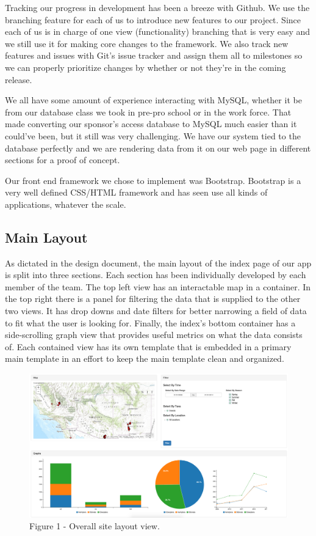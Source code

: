 \documentclass[journal]{IEEEtran}
\begin{document}
Tracking our progress in development has been a breeze with Github. We use the
branching feature for each of us to introduce new features to our project.
Since each of us is in charge of one view (functionality) branching that is
very easy and we still use it for making core changes to the framework. We also
track new features and issues with Git’s issue tracker and assign them all to
milestones so we can properly prioritize changes by whether or not they’re in
the coming release.


We all have some amount of experience interacting with MySQL, whether it be
from our database class we took in pre-pro school or in the work force. That
made converting our sponsor’s access database to MySQL much easier than it
could’ve been, but it still was very challenging. We have our system tied to
the database perfectly and we are rendering data from it on our web page in
different sections for a proof of concept.


Our front end framework we chose to implement was Bootstrap. Bootstrap is a
very well defined CSS/HTML framework and has seen use all kinds of
applications, whatever the scale.

\subsection{Main Layout}
As dictated in the design document, the main layout of the index page of our
app is split into three sections. Each section has been individually developed
by each member of the team. The top left view has an interactable map in a
container. In the top right there is a panel for filtering the data that is
supplied to the other two views. It has drop downs and date filters for better
narrowing a field of data to fit what the user is looking for. Finally, the
index’s bottom container has a side-scrolling graph view that provides useful
metrics on what the data consists of. Each contained view has its own template
that is embedded in a primary main template in an effort to keep the main
template clean and organized.

\begin{figure}[h]
\caption{Figure 1 - Overall site layout view.}
\centering
\includegraphics[width=1.0\textwidth]{images/figure_1.jpg}
\end{figure}
\end{document}
